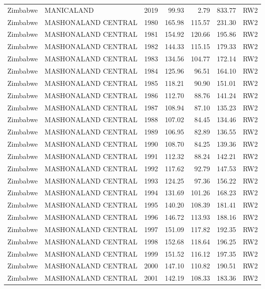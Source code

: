 \begin{longtable}{lllrrrl}
  Zimbabwe & MANICALAND & 2019 & 99.93 & 2.79 & 833.77 & RW2 \\ 
  Zimbabwe & MASHONALAND CENTRAL & 1980 & 165.98 & 115.57 & 231.30 & RW2 \\ 
  Zimbabwe & MASHONALAND CENTRAL & 1981 & 154.92 & 120.66 & 195.86 & RW2 \\ 
  Zimbabwe & MASHONALAND CENTRAL & 1982 & 144.33 & 115.15 & 179.33 & RW2 \\ 
  Zimbabwe & MASHONALAND CENTRAL & 1983 & 134.56 & 104.77 & 172.14 & RW2 \\ 
  Zimbabwe & MASHONALAND CENTRAL & 1984 & 125.96 & 96.51 & 164.10 & RW2 \\ 
  Zimbabwe & MASHONALAND CENTRAL & 1985 & 118.21 & 90.90 & 151.01 & RW2 \\ 
  Zimbabwe & MASHONALAND CENTRAL & 1986 & 112.70 & 88.76 & 141.24 & RW2 \\ 
  Zimbabwe & MASHONALAND CENTRAL & 1987 & 108.94 & 87.10 & 135.23 & RW2 \\ 
  Zimbabwe & MASHONALAND CENTRAL & 1988 & 107.02 & 84.45 & 134.46 & RW2 \\ 
  Zimbabwe & MASHONALAND CENTRAL & 1989 & 106.95 & 82.89 & 136.55 & RW2 \\ 
  Zimbabwe & MASHONALAND CENTRAL & 1990 & 108.70 & 84.25 & 139.36 & RW2 \\ 
  Zimbabwe & MASHONALAND CENTRAL & 1991 & 112.32 & 88.24 & 142.21 & RW2 \\ 
  Zimbabwe & MASHONALAND CENTRAL & 1992 & 117.62 & 92.79 & 147.53 & RW2 \\ 
  Zimbabwe & MASHONALAND CENTRAL & 1993 & 124.25 & 97.36 & 156.22 & RW2 \\ 
  Zimbabwe & MASHONALAND CENTRAL & 1994 & 131.69 & 101.26 & 168.23 & RW2 \\ 
  Zimbabwe & MASHONALAND CENTRAL & 1995 & 140.20 & 108.39 & 181.41 & RW2 \\ 
  Zimbabwe & MASHONALAND CENTRAL & 1996 & 146.72 & 113.93 & 188.16 & RW2 \\ 
  Zimbabwe & MASHONALAND CENTRAL & 1997 & 151.09 & 117.82 & 192.35 & RW2 \\ 
  Zimbabwe & MASHONALAND CENTRAL & 1998 & 152.68 & 118.64 & 196.25 & RW2 \\ 
  Zimbabwe & MASHONALAND CENTRAL & 1999 & 151.52 & 116.12 & 197.35 & RW2 \\ 
  Zimbabwe & MASHONALAND CENTRAL & 2000 & 147.10 & 110.82 & 190.51 & RW2 \\ 
  Zimbabwe & MASHONALAND CENTRAL & 2001 & 142.19 & 108.33 & 183.36 & RW2 \\ 

\end{longtable}
